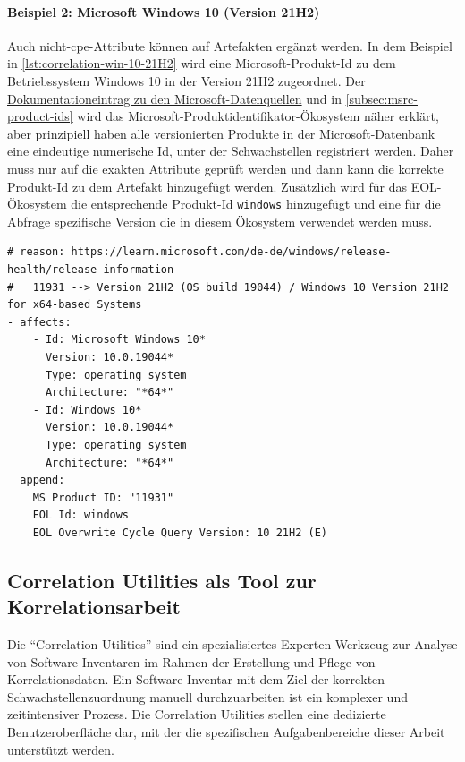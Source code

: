 \paragraph{Beispiel 2: Microsoft Windows 10 (Version 21H2)}
Auch nicht-\acrshort{cpe}-Attribute können auf Artefakten ergänzt werden.
In dem Beispiel in \autoref{lst:correlation-win-10-21H2} wird eine Microsoft-Produkt-Id zu dem Betriebssystem Windows 10 in der Version 21H2 zugeordnet.
Der \href{https://github.com/org-metaeffekt/metaeffekt-documentation/blob/bd184b2889d5421b5a71dcd26c1ac0ffc63d07e7/metaeffekt-vulnerability-management/data-mirror/msrc/understanding-data.md}{Dokumentationeintrag zu den Microsoft-Datenquellen} und in \autoref{subsec:msrc-product-ids} wird das Microsoft-Produktidentifikator-Ökosystem näher erklärt, aber prinzipiell haben alle versionierten Produkte in der Microsoft-Datenbank eine eindeutige numerische Id, unter der Schwachstellen registriert werden.
Daher muss nur auf die exakten Attribute geprüft werden und dann kann die korrekte Produkt-Id zu dem Artefakt hinzugefügt werden.
Zusätzlich wird für das EOL-Ökosystem die entsprechende Produkt-Id \texttt{windows} hinzugefügt und eine für die Abfrage spezifische Version die in diesem Ökosystem verwendet werden muss.

\begin{lstlisting}[style=yaml,caption={Korrelationseintrag für Snappy-Komponenten},label={lst:correlation-win-10-21H2}]
# reason: https://learn.microsoft.com/de-de/windows/release-health/release-information
#   11931 --> Version 21H2 (OS build 19044) / Windows 10 Version 21H2 for x64-based Systems
- affects:
    - Id: Microsoft Windows 10*
      Version: 10.0.19044*
      Type: operating system
      Architecture: "*64*"
    - Id: Windows 10*
      Version: 10.0.19044*
      Type: operating system
      Architecture: "*64*"
  append:
    MS Product ID: "11931"
    EOL Id: windows
    EOL Overwrite Cycle Query Version: 10 21H2 (E)
\end{lstlisting}

\subsection{Correlation Utilities als Tool zur Korrelationsarbeit}

Die \enquote{Correlation Utilities} sind ein spezialisiertes Experten-Werkzeug zur Analyse von Software-Inventaren im Rahmen der Erstellung und Pflege von Korrelationsdaten.
Ein Software-Inventar mit dem Ziel der korrekten Schwachstellenzuordnung manuell durchzuarbeiten ist ein komplexer und zeitintensiver Prozess.
Die Correlation Utilities stellen eine dedizierte Benutzeroberfläche dar, mit der die spezifischen Aufgabenbereiche dieser Arbeit unterstützt werden.

